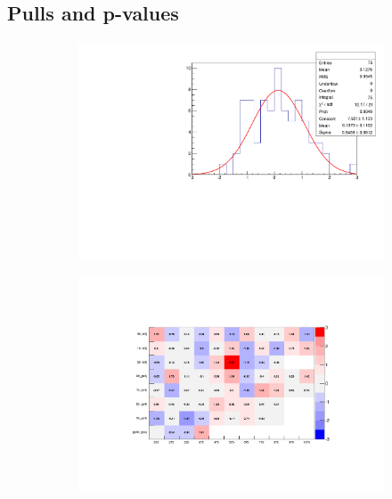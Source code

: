 \subsection{Pulls and p-values}

\begin{figure}[h!]
  \centering
  \begin{subfigure}[b]{0.46\textwidth}
    \includegraphics[width=\textwidth]{Figs/results/v0/pulls/pull_per_bin.pdf}
    \caption{}
    \label{fig:pull_distro}
  \end{subfigure}
  \begin{subfigure}[b]{0.46\textwidth}
    \includegraphics[width=\textwidth]{Figs/results/v0/pulls/chris_latest2_2.pdf}
    \caption{}
    \label{fig:french_flag}
  \end{subfigure}\\

\end{figure}
